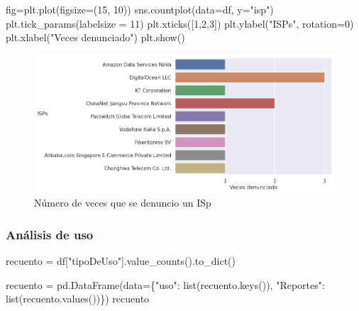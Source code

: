 \documentclass[
  letterpaper,
  DIV=11,
  numbers=noendperiod]{scrartcl}
\newenvironment{Shaded}{\begin{snugshade}}{\end{snugshade}}
\newcommand{\BuiltInTok}[1]{\textcolor[rgb]{0.00,0.23,0.31}{#1}}
\newcommand{\DecValTok}[1]{\textcolor[rgb]{0.68,0.00,0.00}{#1}}
\newcommand{\NormalTok}[1]{\textcolor[rgb]{0.00,0.23,0.31}{#1}}
\newcommand{\OperatorTok}[1]{\textcolor[rgb]{0.37,0.37,0.37}{#1}}
\newcommand{\StringTok}[1]{\textcolor[rgb]{0.13,0.47,0.30}{#1}}
\begin{document}
\begin{Shaded}
\begin{Highlighting}[]
\NormalTok{fig}\OperatorTok{=}\NormalTok{plt.plot(figsize}\OperatorTok{=}\NormalTok{(}\DecValTok{15}\NormalTok{, }\DecValTok{10}\NormalTok{))}
\NormalTok{sns.countplot(data}\OperatorTok{=}\NormalTok{df, y}\OperatorTok{=}\StringTok{"isp"}\NormalTok{)}
\NormalTok{plt.tick\_params(labelsize }\OperatorTok{=} \DecValTok{11}\NormalTok{)}
\NormalTok{plt.xticks([}\DecValTok{1}\NormalTok{,}\DecValTok{2}\NormalTok{,}\DecValTok{3}\NormalTok{])}
\NormalTok{plt.ylabel(}\StringTok{"ISPs"}\NormalTok{, rotation}\OperatorTok{=}\DecValTok{0}\NormalTok{)}
\NormalTok{plt.xlabel(}\StringTok{"Veces denunciado"}\NormalTok{)}
\NormalTok{plt.show()}
\end{Highlighting}
\end{Shaded}

\begin{figure}[H]

{\centering \includegraphics{Análisis_files/figure-pdf/fig-isps-output-1.png}

}

\caption{\label{fig-isps}Número de veces que se denuncio un ISp}

\end{figure}

\hypertarget{anuxe1lisis-de-uso}{%
\subsubsection{Análisis de uso}\label{anuxe1lisis-de-uso}}

\begin{Shaded}
\begin{Highlighting}[]
\NormalTok{recuento }\OperatorTok{=}\NormalTok{ df[}\StringTok{"tipoDeUso"}\NormalTok{].value\_counts().to\_dict()}

\NormalTok{recuento }\OperatorTok{=}\NormalTok{ pd.DataFrame(data}\OperatorTok{=}\NormalTok{\{}\StringTok{"uso"}\NormalTok{: }\BuiltInTok{list}\NormalTok{(recuento.keys()), }\StringTok{"Reportes"}\NormalTok{: }\BuiltInTok{list}\NormalTok{(recuento.values())\})}
\NormalTok{recuento}
\end{Highlighting}
\end{Shaded}
\end{document}
